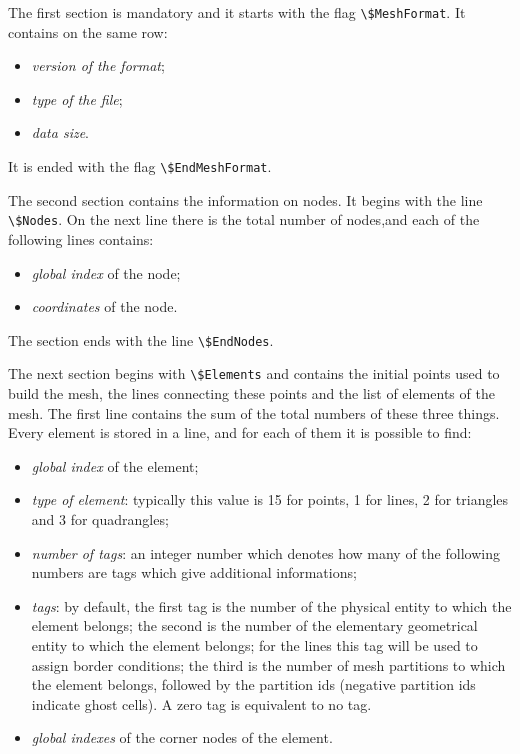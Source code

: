 The first section is mandatory and it starts with the flag \verb|\$MeshFormat|. It contains on the  same row:

\begin{itemize}
\item \textit{version of the format};
\item \textit{type of the file};
\item \textit{data size}.
\end{itemize}

It is ended with the flag \verb|\$EndMeshFormat|.

The second section contains the information on nodes. It begins with the line \verb|\$Nodes|. On the next line there is the total number of nodes,and each of the following lines contains:

\begin{itemize}
\item \textit{global index} of the node;
\item \textit{coordinates} of the node.
\end{itemize}

The section ends with the line \verb|\$EndNodes|.

The next section begins with \verb|\$Elements| and contains the initial points used to build the mesh, the lines connecting these points and the list of elements of the mesh. The first line contains the sum of the total numbers of these three things.  Every element is stored in a line, and for each of them it is possible to find:

\begin{itemize}
\item \textit{global index} of the element;
\item \textit{type of element}: typically this value is 15 for points, 1 for lines, 2 for triangles and 3 for quadrangles;
\item \textit{number of tags}: an integer number which denotes how many of the following numbers are tags which give additional informations;
\item \textit{tags}: by default, the first tag is the number of the physical entity to which the element belongs; the second is the number of the elementary geometrical entity to which the element belongs; for the lines this tag will be used to assign border conditions; the third is the number of mesh partitions to which the element belongs, followed by the partition ids (negative partition ids indicate ghost cells). A zero tag is equivalent to no tag.
\item \textit{global indexes} of the corner nodes of the element.

\end{itemize}

